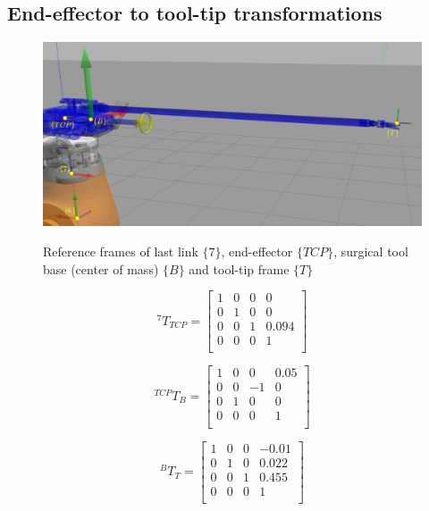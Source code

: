 \subsection{End-effector to tool-tip transformations}
\label{section:eef-tool-tip-transformations}

\begin{center}
\begin{figure}[!htb]
\centering
\includegraphics[width=\textwidth]{images/eef_tcp_tip_tf.png}\\
\caption{Reference frames of last link $\lbrace 7 \rbrace$, end-effector $\lbrace TCP \rbrace$, surgical tool base (center of mass) $\lbrace B \rbrace$ and tool-tip frame $\lbrace T \rbrace$}
\end{figure}
\end{center}

\[
^{7}T_{TCP} = 
\begin{bmatrix}
1 & 0 & 0 & 0 \\
0 & 1 & 0 & 0 \\
0 & 0 & 1 & 0.094 \\
0 & 0 & 0 & 1 \\
\end{bmatrix}
\]

\[
^{TCP}T_{B} = 
\begin{bmatrix}
1 & 0 & 0 & 0.05 \\
0 & 0 & -1 & 0 \\
0 & 1 & 0 & 0 \\
0 & 0 & 0 & 1 \\
\end{bmatrix}
\]

\[
^{B}T_T = 
\begin{bmatrix}
1 & 0 & 0 & -0.01 \\
0 & 1 & 0 & 0.022 \\
0 & 0 & 1 & 0.455 \\
0 & 0 & 0 & 1 \\
\end{bmatrix}
\]


